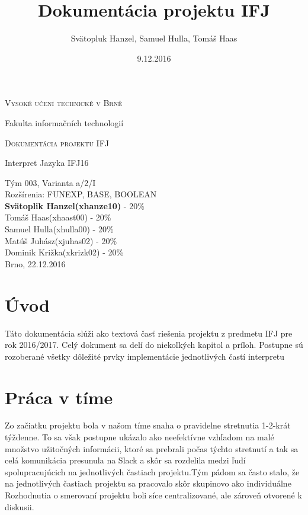 \documentclass[12pt, a4paper]{article}
\title{Dokumentácia projektu IFJ}
\author{Svätopluk Hanzel, Samuel Hulla, Tomáš Haas}
\date{9.12.2016}
\begin{document}
    \begin{titlepage}
        \begin{center}
        {\scshape\LARGE Vysoké učení technické v Brně \par}
        {\Large Fakulta informačních technologií\par}
        \vspace{3cm}
        {\scshape\LARGE Dokumentácia projektu IFJ\par}
        {\Large Interpret Jazyka IFJ16 \par}
        \vfill
        {\Large Tým 003, Varianta a/2/I}\\
        Rozšírenia: FUNEXP, BASE, BOOLEAN\\
        \vspace{1cm}
        \textbf{Svätoplik Hanzel(xhanze10)} - 20\% \\
        Tomáš Haas(xhaast00) - 20\% \\
        Samuel Hulla(xhulla00) - 20\% \\
        Matúš Juhász(xjuhas02) - 20\% \\
        Dominik Križka(xkrizk02) - 20\% \\
        \vspace{1cm}
        {\hfill Brno, 22.12.2016}
        \end{center}
    \end{titlepage}
    
    \tableofcontents{}
    \newpage
    \setcounter{page}{1}
    \section{Úvod}
    Táto dokumentácia slúži ako textová časť riešenia projektu z predmetu IFJ pre rok 2016/2017. Celý dokument sa delí do niekoľkých kapitol a príloh. Postupne sú rozoberané všetky dôležité prvky implementácie jednotlivých častí interpretu
    \newpage
    \section{Práca v tíme}
     Zo začiatku projektu bola v našom tíme snaha o pravidelne stretnutia 1-2-krát týždenne. To sa však postupne ukázalo ako neefektívne vzhľadom na malé množstvo užitočných informácii, ktoré sa prebrali počas týchto stretnutí a tak sa celá komunikácia presunula na Slack a skôr sa rozdelila medzi ľudí spolupracujúcich na jednotlivých častiach projektu.Tým pádom sa často stalo, že na jednotlivých častiach projektu sa pracovalo skôr skupinovo ako individuálne \\
	 Rozhodnutia o smerovaní projektu boli síce centralizované, ale zároveň otvorené k diskusii.        
\end{document}
